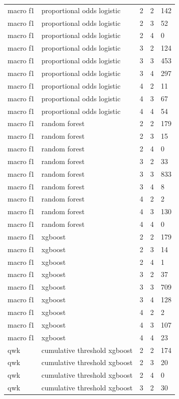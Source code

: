 \documentclass[
  a4paper,
  review]{elsarticle}
\begin{document}
{\begin{longtable}[]{@{}lllll@{}}
macro f1 & proportional odds logistic & 2 & 2 & 142 \\
macro f1 & proportional odds logistic & 2 & 3 & 52 \\
macro f1 & proportional odds logistic & 2 & 4 & 0 \\
macro f1 & proportional odds logistic & 3 & 2 & 124 \\
macro f1 & proportional odds logistic & 3 & 3 & 453 \\
macro f1 & proportional odds logistic & 3 & 4 & 297 \\
macro f1 & proportional odds logistic & 4 & 2 & 11 \\
macro f1 & proportional odds logistic & 4 & 3 & 67 \\
macro f1 & proportional odds logistic & 4 & 4 & 54 \\
macro f1 & random forest & 2 & 2 & 179 \\
macro f1 & random forest & 2 & 3 & 15 \\
macro f1 & random forest & 2 & 4 & 0 \\
macro f1 & random forest & 3 & 2 & 33 \\
macro f1 & random forest & 3 & 3 & 833 \\
macro f1 & random forest & 3 & 4 & 8 \\
macro f1 & random forest & 4 & 2 & 2 \\
macro f1 & random forest & 4 & 3 & 130 \\
macro f1 & random forest & 4 & 4 & 0 \\
macro f1 & xgboost & 2 & 2 & 179 \\
macro f1 & xgboost & 2 & 3 & 14 \\
macro f1 & xgboost & 2 & 4 & 1 \\
macro f1 & xgboost & 3 & 2 & 37 \\
macro f1 & xgboost & 3 & 3 & 709 \\
macro f1 & xgboost & 3 & 4 & 128 \\
macro f1 & xgboost & 4 & 2 & 2 \\
macro f1 & xgboost & 4 & 3 & 107 \\
macro f1 & xgboost & 4 & 4 & 23 \\
qwk & cumulative threshold xgboost & 2 & 2 & 174 \\
qwk & cumulative threshold xgboost & 2 & 3 & 20 \\
qwk & cumulative threshold xgboost & 2 & 4 & 0 \\
qwk & cumulative threshold xgboost & 3 & 2 & 30 \\

\end{longtable}}
\end{document}
